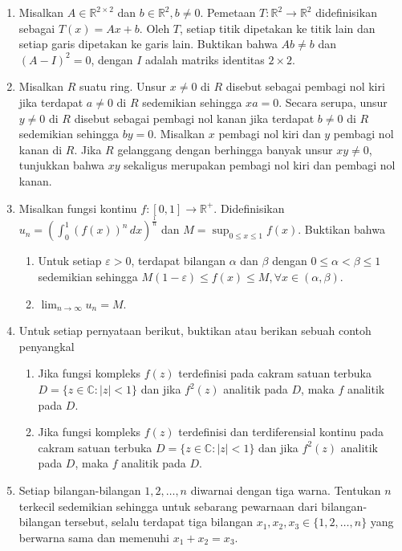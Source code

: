 \documentclass[12pt,twoside]{article}
\begin{document}
\begin{enumerate}
    \item Misalkan $A\in\mathbb{R}^{2\times 2}$ dan $b\in \mathbb{R}^2,b\neq 0$. Pemetaan $T:\mathbb{R}^2\to\mathbb{R}^2$ didefinisikan sebagai $T(x)=Ax+b$. Oleh $T$, setiap titik dipetakan ke titik lain dan setiap garis dipetakan ke garis lain. Buktikan bahwa $Ab\neq b$ dan $(A-I)^	2=0$, dengan $I$ adalah matriks identitas $2\times2$.
    \item Misalkan $R$ suatu ring. Unsur $x\neq 0$ di $R$ disebut sebagai pembagi nol kiri jika terdapat $a\neq 0$ di $R$ sedemikian sehingga $xa=0.$ Secara serupa, unsur $y\neq 0$ di $R$ disebut sebagai pembagi nol kanan jika terdapat $b\neq 0$ di $R$ sedemikian sehingga $by=0$. Misalkan $x$ pembagi nol kiri dan $y$ pembagi nol kanan di $R$. Jika $R$ gelanggang dengan berhingga banyak unsur $xy\neq 0$, tunjukkan bahwa $xy$ sekaligus merupakan pembagi nol kiri dan pembagi nol kanan.

    \item Misalkan fungsi kontinu $f:[0,1]\to \mathbb{R}^{+}$. Didefinisikan $u_n=\left(\displaystyle\int_{0}^{1}\left(f(x)\right)^n\,dx \right)^{\frac{1}{n}}$ dan $\displaystyle M=\sup_{0\leq x\leq 1}f(x)$. Buktikan bahwa
          \begin{enumerate}
              \item[(a)]Untuk setiap $\varepsilon>0$, terdapat bilangan $\alpha$ dan $\beta$ dengan $0\leq \alpha<\beta\leq 1$ sedemikian sehingga $M(1-\varepsilon)\leq f(x)\leq M, \forall x\in(\alpha,\beta)$.

              \item[(b)] $\displaystyle
                        \lim_{n\to\infty}u_n=M$.
          \end{enumerate}

    \item Untuk setiap pernyataan berikut, buktikan atau berikan sebuah contoh penyangkal
          \begin{enumerate}
              \item [(a)] Jika fungsi kompleks $f(z)$ terdefinisi pada cakram satuan terbuka $D=\{z\in\mathbb{C}:|z|<1\}$ dan jika $f^2(z)$ analitik pada $D$, maka $f$ analitik pada $D$.
              \item[(b)] Jika fungsi kompleks $f(z)$ terdefinisi dan terdiferensial kontinu pada cakram satuan terbuka $D=\{z\in\mathbb{C}:|z|<1\}$ dan jika $f^2(z)$ analitik pada $D$, maka $f$ analitik pada $D$.
          \end{enumerate}

    \item Setiap bilangan-bilangan $1,2,\dots,n$ diwarnai dengan tiga warna. Tentukan $n$ terkecil sedemikian sehingga untuk sebarang pewarnaan dari bilangan-bilangan tersebut, selalu terdapat tiga bilangan $x_1,x_2,x_3\in\{1,2,\dots,n\}$ yang berwarna sama dan memenuhi $x_1+x_2=x_3$.

\end{enumerate}
\newpage
\end{document}
